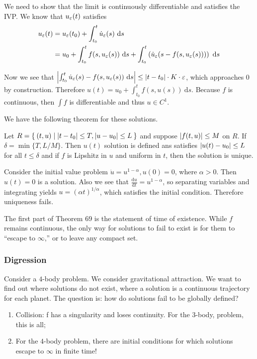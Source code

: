\documentclass[10pt, twoside]{article}
\renewcommand{\d}{\ \mathrm{d}}
\begin{document}
\begin{exm}
        We need to show that the limit is continuously differentiable and satisfies the IVP. We know that $u_{\varepsilon}(t)$ satisfies \begin{align*}
            u_{\ep}(t) &= u_{\ep}(t_0) + \int_{t_0}^t \dot{u}_{\ep}(s) \d s \\
            &= u_0 + \int_{t_0}^t f(s, u_{\ep}(s)) \d s + \int_{t_0}^t \left(\dot{u}_{\ep}(s - f(s,u_{\ep}(s)))\right) \d s
        \end{align*}

        Now we see that $\abs*{\int_{t_0}^t \dot{u}_{\ep}(s) - f(s,u_{\ep}(s)) \d s} \leq \abs{t-t_0}\cdot K \cdot \ep$, which approaches $0$ by construction. Therefore $u(t) = u_0 + \int_{t_0}^t f(s,u(s)) \d s$. Because $f$ is continuous, then $\int f$ is differentiable and thus $u \in C^1$.
    \end{exm}
    
    We have the following theorem for these solutions.
    \begin{thm}
        Let $R = \Set{(t,u) | \lvert t-t_0\rvert \leq T, \lvert u-u_0\rvert \leq L}$ and suppose $\lvert f(t,u)\rvert \leq M$ on $R$. If $\delta = \min\{T,L/M\}$. Then $u(t)$ solution is defined ans satisfies $\lvert u(t) - u_0\rvert \leq L$ for all $t \leq \delta$ and if $f$ is Lipshitz in $u$ and uniform in $t$, then the solution is unique.
    \end{thm}

    \begin{exm}
        Consider the initial value problem $\dot{u} = u^{1- \alpha}, u(0) = 0$, where $\alpha > 0$. Then $u(t) = 0$ is a solution. Also we see that $\frac{\mathrm{d} u}{\mathrm{d} t} = u^{1-\alpha}$, so separating variables and integrating yields $u = (\alpha t)^{1/\alpha}$, which satisfies the initial condition. Therefore uniqueness fails.
    \end{exm}

    The first part of Theorem 69 is the statement of time of existence. While $f$ remains continuous, the only way for solutions to fail to exist is for them to ``escape to $\infty$,'' or to leave any compact set.

    \subsubsection{Digression}
    Consider a $4$-body problem. We consider gravitational attraction. We want to find out where solutions do not exist, where a solution is a continuous trajectory for each planet. The question is: how do solutions fail to be globally defined?
    \begin{enumerate}
        \item Collision: f has a singularity and loses continuity. For the $3$-body, problem, this is all;
        \item For the $4$-body problem, there are initial conditions for which solutions escape to $\infty$ in finite time!
    \end{enumerate}
\end{document}
